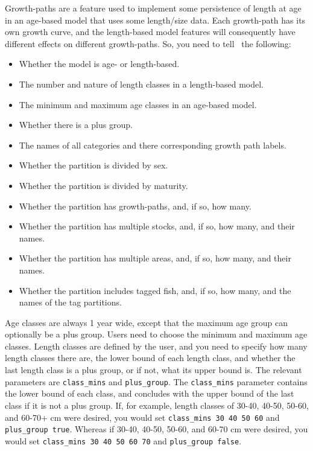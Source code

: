 Growth-paths are a feature used to implement some persistence of length at age in an age-based model that uses some length/size data. Each growth-path has its own growth curve, and the length-based model features will consequently  have different effects on different growth-paths. So, you need to tell \CNAME\ the following: 

\begin{itemize}
\item Whether the model is age- or length-based.
\item The number and nature of length classes in a length-based model.
\item	The minimum and maximum age classes in an age-based model.
\item	Whether there is a plus group.
\item 	The names of all categories and there corresponding growth path labels.
\item	Whether the partition is divided by sex.
\item	Whether the partition is divided by maturity.
\item	Whether the partition has growth-paths, and, if so, how many.
\item	Whether the partition has multiple stocks, and, if so, how many, and their names.
\item	Whether the partition has multiple areas, and, if so, how many, and their names.
\item	Whether the partition includes tagged fish, and, if so, how many, and the names of the tag partitions.
\end{itemize}

Age classes are always 1 year wide, except that the maximum age group can optionally be a plus group. Users need to choose the minimum and maximum age classes. Length classes are defined by the user, and you need to specify how many length classes there are, the lower bound of each length class, and whether the last length class is a plus group, or if not, what its upper bound is. The relevant parameters are \texttt{class\_mins} and \texttt{plus\_group}. The \texttt{class\_mins} parameter contains the lower bound of each class, and concludes with the upper bound of the last class if it is not a plus group. If, for example, length classes of 30-40, 40-50, 50-60, and 60-70+ cm were desired, you would set \texttt{class\_mins 30 40 50 60} and \texttt{plus\_group true}. Whereas if 30-40, 40-50, 50-60, and 60-70 cm were desired, you would set \texttt{class\_mins 30 40 50 60 70} and \texttt{plus\_group false}.

